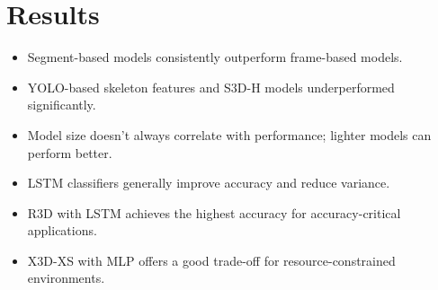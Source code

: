 \section{Results}

\begin{frame}

    
\end{frame}

\begin{frame}

    \vspace{1em}

    \begin{itemize}
        \itemsep1em
        \item Segment-based models consistently outperform frame-based models.
        \item YOLO-based skeleton features and S3D-H models underperformed significantly.
        \item Model size doesn’t always correlate with performance; lighter models can perform better.
        \item LSTM classifiers generally improve accuracy and reduce variance.
        \item R3D with LSTM achieves the highest accuracy for accuracy-critical applications.
        \item X3D-XS with MLP offers a good trade-off for resource-constrained environments.
    \end{itemize}

\end{frame}